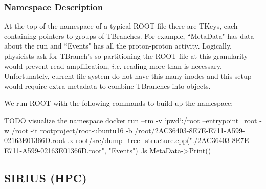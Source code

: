 \subsubsection{Namespace Description}

At the top of the namespace of a typical ROOT file there are TKeys, each
containing pointers to groups of TBranches. For example, ``MetaData" has data
about the run and ``Events" has all the proton-proton activity. Logically,
physicists ask for TBranch's so partitioning the ROOT file at this granularity
would prevent read amplification, {\it i.e.} reading more than is necessary.
Unfortunately, current file system do not have this many inodes and this setup
would require extra metadata to combine TBranches into objects.

We run ROOT with the following commands to build up the namespace:

TODO visualize the namespace
docker run --rm -v `pwd`:/root --entrypoint=root -w /root -it  rootproject/root-ubuntu16  -b /root/2AC36403-8E7E-E711-A599-02163E01366D.root
 .x root/src/dump_tree_structure.cpp("./2AC36403-8E7E-E711-A599-02163E01366D.root", "Events")
.ls
MetaData->Print()

\subsection{SIRIUS (HPC)}
